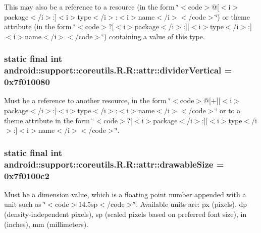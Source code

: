 This may also be a reference to a resource (in the form \char`\"{}$<$code$>$@\mbox{[}$<$i$>$package$<$/i$>$:\mbox{]}$<$i$>$type$<$/i$>$:$<$i$>$name$<$/i$>$$<$/code$>$\char`\"{}) or theme attribute (in the form \char`\"{}$<$code$>$?\mbox{[}$<$i$>$package$<$/i$>$:\mbox{]}\mbox{[}$<$i$>$type$<$/i$>$:\mbox{]}$<$i$>$name$<$/i$>$$<$/code$>$\char`\"{}) containing a value of this type. \hypertarget{classandroid_1_1support_1_1coreutils_1_1_r_1_1attr_1c12d605d1eae5be1674f2af474975a5}{
\subsubsection[{dividerVertical}]{\setlength{\rightskip}{0pt plus 5cm}static final int android::support::coreutils.R.R::attr::dividerVertical = 0x7f010080}}
\label{classandroid_1_1support_1_1coreutils_1_1_r_1_1attr_1c12d605d1eae5be1674f2af474975a5}


Must be a reference to another resource, in the form \char`\"{}$<$code$>$@\mbox{[}+\mbox{]}\mbox{[}$<$i$>$package$<$/i$>$:\mbox{]}$<$i$>$type$<$/i$>$:$<$i$>$name$<$/i$>$$<$/code$>$\char`\"{} or to a theme attribute in the form \char`\"{}$<$code$>$?\mbox{[}$<$i$>$package$<$/i$>$:\mbox{]}\mbox{[}$<$i$>$type$<$/i$>$:\mbox{]}$<$i$>$name$<$/i$>$$<$/code$>$\char`\"{}. \hypertarget{classandroid_1_1support_1_1coreutils_1_1_r_1_1attr_fb711fd263a47703cde855fef5d0dc47}{
\subsubsection[{drawableSize}]{\setlength{\rightskip}{0pt plus 5cm}static final int android::support::coreutils.R.R::attr::drawableSize = 0x7f0100c2}}
\label{classandroid_1_1support_1_1coreutils_1_1_r_1_1attr_fb711fd263a47703cde855fef5d0dc47}


Must be a dimension value, which is a floating point number appended with a unit such as \char`\"{}$<$code$>$14.5sp$<$/code$>$\char`\"{}. Available units are: px (pixels), dp (density-independent pixels), sp (scaled pixels based on preferred font size), in (inches), mm (millimeters). 

